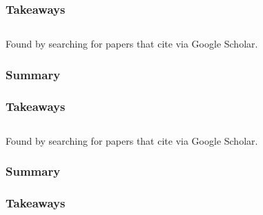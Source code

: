 \documentclass[
	letterpaper, %
]{jdf}
\begin{document}
\subsubsection{Takeaways}

\subsection{}

Found by searching for papers that cite \cite{important_adaptive_learning_exercise_generation} via Google Scholar.

\subsubsection{Summary}


\subsubsection{Takeaways}

\subsection{}
Found by searching for papers that cite \cite{important_adaptive_learning_exercise_generation} via Google Scholar.

\subsubsection{Summary}


\subsubsection{Takeaways}


\subsection{}
\end{document}
